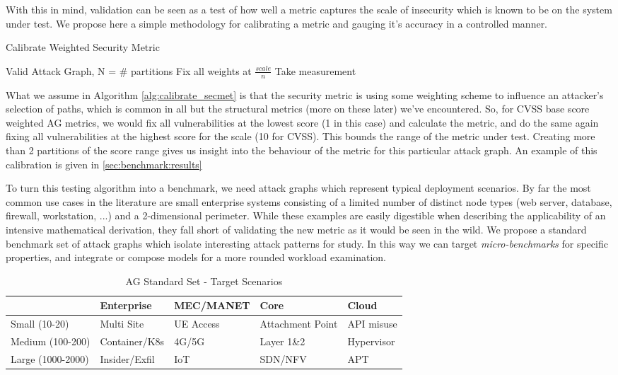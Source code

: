 With this in mind, validation can be seen as a test of how well a metric captures the scale of insecurity which is known to be on the system under test. We propose here a simple methodology for calibrating a metric and gauging it's accuracy in a controlled manner. 

\begin{algorithm}
\caption{Calibrate Weighted Security Metric}
\label{alg:calibrate_secmet}
\begin{algorithmic}
\REQUIRE Valid Attack Graph, N = \# partitions
 \STATE Fix all weights at $\frac{scale}{n}$ 
 \STATE Take measurement
\ENDFOR
 \end{algorithmic}
\end{algorithm}

What we assume in Algorithm \ref{alg:calibrate_secmet} is that the security metric is using some weighting scheme to influence an attacker's selection of paths, which is common in all but the structural metrics (more on these later) we've encountered. So, for CVSS base score weighted AG metrics, we would fix all vulnerabilities at the lowest score (1 in this case) and calculate the metric, and do the same again fixing all vulnerabilities at the highest score for the scale (10 for CVSS). This bounds the range of the metric under test. Creating more than 2 partitions of the score range gives us insight into the behaviour of the metric for this particular attack graph. An example of this calibration is given in \ref{sec:benchmark:results}

To turn this testing algorithm into a benchmark, we need attack graphs which represent typical deployment scenarios. By far the most common use cases in the literature are small enterprise systems consisting of a limited number of distinct node types (web server, database, firewall, workstation, ...) and a 2-dimensional perimeter. While these examples are easily digestible when describing the applicability of an intensive mathematical derivation, they fall short of validating the new metric as it would be seen in the wild. We propose a standard benchmark set of attack graphs which isolate interesting attack patterns for study. In this way we can target \textit{micro-benchmarks} for specific properties, and integrate or compose models for a more rounded workload examination.

\begin{table*}[ht]
\centering
\caption{AG Standard Set - Target Scenarios}
\label{tab:ag_standard_set}
\begin{tabular}{@{}p{.15\linewidth}p{.15\linewidth}p{.15\linewidth}p{.15\linewidth}p{.15\linewidth}@{}}
\toprule
 & Enterprise & MEC/MANET &  Core &  Cloud \\ \midrule
Small (10-20) & Multi Site & UE Access  & Attachment Point & API misuse \\
Medium (100-200) & Container/K8s & 4G/5G & Layer 1\&2 & Hypervisor  \\
Large (1000-2000) & Insider/Exfil  &  IoT &  SDN/NFV & APT  \\ \bottomrule
\end{tabular}
\end{table*}

